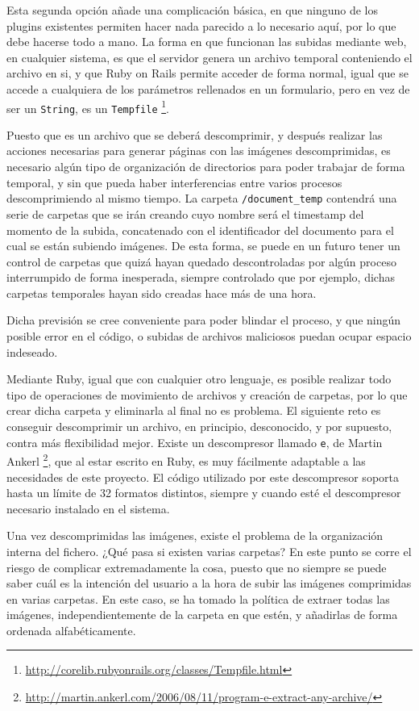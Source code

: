 Esta segunda opción añade una complicación básica, en que ninguno de los plugins existentes permiten hacer nada parecido a lo necesario aquí, por lo que debe hacerse todo a mano. La forma en que funcionan las subidas mediante web, en cualquier sistema, es que el servidor genera un archivo temporal conteniendo el archivo en si, y que Ruby on Rails permite acceder de forma normal, igual que se accede a cualquiera de los parámetros rellenados en un formulario, pero en vez de ser un \texttt{String}, es un \texttt{Tempfile} \footnote{\url{http://corelib.rubyonrails.org/classes/Tempfile.html}}. 

Puesto que es un archivo que se deberá descomprimir, y después realizar las acciones necesarias para generar páginas con las imágenes descomprimidas, es necesario algún tipo de organización de directorios para poder trabajar de forma temporal, y sin que pueda haber interferencias entre varios procesos descomprimiendo al mismo tiempo. La carpeta \texttt{/document\_temp} contendrá una serie de carpetas que se irán creando cuyo nombre será el timestamp del momento de la subida, concatenado con el identificador del documento para el cual se están subiendo imágenes. De esta forma, se puede en un futuro tener un control de carpetas que quizá hayan quedado descontroladas por algún proceso interrumpido de forma inesperada, siempre controlado que por ejemplo, dichas carpetas temporales hayan sido creadas hace más de una hora.

Dicha previsión se cree conveniente para poder blindar el proceso, y que ningún posible error en el código, o subidas de archivos maliciosos puedan ocupar espacio indeseado.

Mediante Ruby, igual que con cualquier otro lenguaje, es posible realizar todo tipo de operaciones de movimiento de archivos y creación de carpetas, por lo que crear dicha carpeta y eliminarla al final no es problema. El siguiente reto es conseguir descomprimir un archivo, en principio, desconocido, y por supuesto, contra más flexibilidad mejor. Existe un descompresor llamado \texttt{e}, de Martin Ankerl \footnote{\url{http://martin.ankerl.com/2006/08/11/program-e-extract-any-archive/}}, que al estar escrito en Ruby, es muy fácilmente adaptable a las necesidades de este proyecto. El código utilizado por este descompresor soporta hasta un límite de 32 formatos distintos, siempre y cuando esté el descompresor necesario instalado en el sistema.

Una vez descomprimidas las imágenes, existe el problema de la organización interna del fichero. ¿Qué pasa si existen varias carpetas? En este punto se corre el riesgo de complicar extremadamente la cosa, puesto que no siempre se puede saber cuál es la intención del usuario a la hora de subir las imágenes comprimidas en varias carpetas. En este caso, se ha tomado la política de extraer todas las imágenes, independientemente de la carpeta en que estén, y añadirlas de forma ordenada alfabéticamente.

